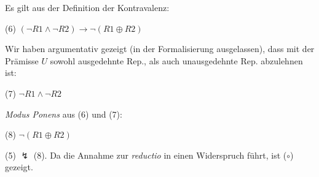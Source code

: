 \documentclass[a4paper, 12pt]{article}
\begin{document}
\noindent Es gilt aus der Definition der Kontravalenz: 

\vspace{4pt}
(6) \hspace*{1em}  $(\neg R1 \land \neg R2)  \rightarrow \neg (R1 \oplus R2)$
\vspace{4pt}

\noindent Wir haben argumentativ gezeigt (in der Formalisierung ausgelassen), dass mit der Prämisse $U$ sowohl ausgedehnte Rep., als auch unausgedehnte Rep. abzulehnen ist: 

\vspace{4pt}
(7) \hspace*{1em}  $\neg R1 \land \neg R2$

\vspace{4pt}
\noindent \emph{Modus Ponens} aus (6) und (7):

\vspace{4pt}
(8) \hspace*{1em} $\neg (R1 \oplus R2)$


\vspace{14pt}
\noindent (5) $\lightning$ (8).  Da die Annahme zur \emph{reductio} in einen Widerspruch führt, ist ($\circ$) gezeigt.
\end{document}

